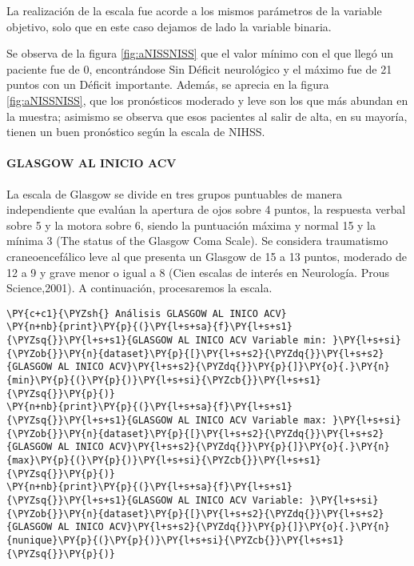     La realización de la escala fue acorde a los mismos parámetros de la variable objetivo, solo que en este caso dejamos de lado la variable
binaria.

Se observa de la figura \ref{fig:aNISSNISS} que el valor mínimo con el que llegó un paciente fue de 0, encontrándose Sin Déficit neurológico y el máximo fue de 21 puntos con un Déficit importante. Además, se aprecia en la figura \ref{fig:aNISSNISS}, que los pronósticos moderado y leve son los que más abundan en la muestra; asimismo se observa que esos pacientes al salir de alta, en su mayoría, tienen un buen pronóstico según la escala de NIHSS.

    \hypertarget{glasgow-al-inico-acv}{%
\paragraph{GLASGOW AL INICIO ACV}\label{glasgow-al-inico-acv}}

La escala de Glasgow se divide en tres grupos puntuables de manera independiente que evalúan la apertura de ojos sobre 4 puntos, la respuesta verbal sobre 5 y la motora sobre 6, siendo la puntuación máxima y normal 15 y la mínima 3 (The status of the Glasgow Coma Scale). Se considera traumatismo craneoencefálico leve al que presenta un Glasgow de 15 a 13 puntos, moderado de 12 a 9 y grave menor o igual a 8 (Cien escalas de interés en Neurología. Prous Science,2001). A continuación, procesaremos la escala.

    \begin{tcolorbox}[breakable, size=fbox, boxrule=1pt, pad at break*=1mm,colback=cellbackground, colframe=cellborder]
\begin{Verbatim}[commandchars=\\\{\}]
\PY{c+c1}{\PYZsh{} Análisis GLASGOW AL INICO ACV}
\PY{n+nb}{print}\PY{p}{(}\PY{l+s+sa}{f}\PY{l+s+s1}{\PYZsq{}}\PY{l+s+s1}{GLASGOW AL INICO ACV Variable min: }\PY{l+s+si}{\PYZob{}}\PY{n}{dataset}\PY{p}{[}\PY{l+s+s2}{\PYZdq{}}\PY{l+s+s2}{GLASGOW AL INICO ACV}\PY{l+s+s2}{\PYZdq{}}\PY{p}{]}\PY{o}{.}\PY{n}{min}\PY{p}{(}\PY{p}{)}\PY{l+s+si}{\PYZcb{}}\PY{l+s+s1}{\PYZsq{}}\PY{p}{)}
\PY{n+nb}{print}\PY{p}{(}\PY{l+s+sa}{f}\PY{l+s+s1}{\PYZsq{}}\PY{l+s+s1}{GLASGOW AL INICO ACV Variable max: }\PY{l+s+si}{\PYZob{}}\PY{n}{dataset}\PY{p}{[}\PY{l+s+s2}{\PYZdq{}}\PY{l+s+s2}{GLASGOW AL INICO ACV}\PY{l+s+s2}{\PYZdq{}}\PY{p}{]}\PY{o}{.}\PY{n}{max}\PY{p}{(}\PY{p}{)}\PY{l+s+si}{\PYZcb{}}\PY{l+s+s1}{\PYZsq{}}\PY{p}{)}
\PY{n+nb}{print}\PY{p}{(}\PY{l+s+sa}{f}\PY{l+s+s1}{\PYZsq{}}\PY{l+s+s1}{GLASGOW AL INICO ACV Variable: }\PY{l+s+si}{\PYZob{}}\PY{n}{dataset}\PY{p}{[}\PY{l+s+s2}{\PYZdq{}}\PY{l+s+s2}{GLASGOW AL INICO ACV}\PY{l+s+s2}{\PYZdq{}}\PY{p}{]}\PY{o}{.}\PY{n}{nunique}\PY{p}{(}\PY{p}{)}\PY{l+s+si}{\PYZcb{}}\PY{l+s+s1}{\PYZsq{}}\PY{p}{)}
\end{Verbatim}
\end{tcolorbox}

